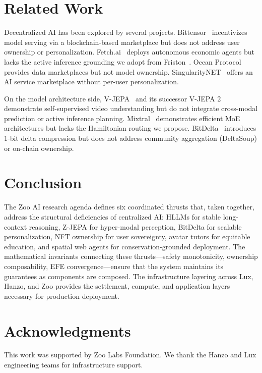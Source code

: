 \documentclass[11pt,letterpaper]{article}
\begin{document}
\section{Related Work}

Decentralized AI has been explored by several projects. Bittensor~\cite{rao2020bittensor} incentivizes model serving via a blockchain-based marketplace but does not address user ownership or personalization. Fetch.ai~\cite{fetchai2019} deploys autonomous economic agents but lacks the active inference grounding we adopt from Friston~\cite{friston2017active}. Ocean Protocol~\cite{oceanprotocol2019} provides data marketplaces but not model ownership. SingularityNET~\cite{goertzel2017singularitynet} offers an AI service marketplace without per-user personalization.

On the model architecture side, V-JEPA~\cite{bardes2024vjepa} and its successor V-JEPA 2~\cite{bardes2025vjepa2} demonstrate self-supervised video understanding but do not integrate cross-modal prediction or active inference planning. Mixtral~\cite{jiang2024mixtral} demonstrates efficient MoE architectures but lacks the Hamiltonian routing we propose. BitDelta~\cite{liu2024bitdelta} introduces 1-bit delta compression but does not address community aggregation (DeltaSoup) or on-chain ownership.

\section{Conclusion}

The Zoo AI research agenda defines six coordinated thrusts that, taken together, address the structural deficiencies of centralized AI: HLLMs for stable long-context reasoning, Z-JEPA for hyper-modal perception, BitDelta for scalable personalization, NFT ownership for user sovereignty, avatar tutors for equitable education, and spatial web agents for conservation-grounded deployment. The mathematical invariants connecting these thrusts---safety monotonicity, ownership composability, EFE convergence---ensure that the system maintains its guarantees as components are composed. The infrastructure layering across Lux, Hanzo, and Zoo provides the settlement, compute, and application layers necessary for production deployment.

\section*{Acknowledgments}

This work was supported by Zoo Labs Foundation. We thank the Hanzo and Lux engineering teams for infrastructure support.
\end{document}
